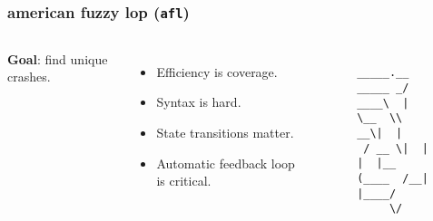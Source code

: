 \begin{frame}[fragile]
\frametitle{american fuzzy lop (\texttt{afl})}

\begin{columns}[c]


\textbf{Goal}: find unique crashes.

\begin{itemize}
    \item Efficiency is coverage.
    \item Syntax is hard.
    \item State transitions matter.
    \item Automatic feedback loop is critical.
\end{itemize}


\begin{center}
\begin{figure}
\begin{verbatim}
        _____.__   
_____ _/ ____\  |  
\__  \\   __\|  |  
 / __ \|  |  |  |__
(____  /__|  |____/
     \/            
\end{verbatim}
\end{figure}
\end{center}

\end{columns}

\end{frame}
